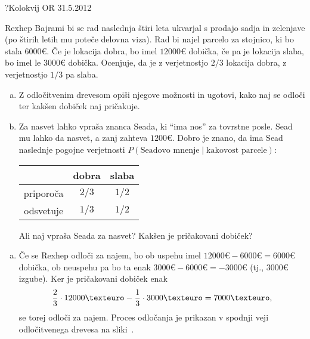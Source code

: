 \begin{naloga}{?}{Kolokvij OR 31.5.2012}
\begin{vprasanje}
Rexhep Bajrami bi se rad naslednja štiri leta
ukvarjal s prodajo sadja in zelenjave
(po štirih letih mu poteče delovna viza).
Rad bi najel parcelo za stojnico, ki bo stala $6000 €$.
Če je lokacija dobra, bo imel $12000 €$ dobička,
če pa je lokacija slaba, bo imel le $3000 €$ dobička.
Ocenjuje, da je z verjetnostjo $2/3$ lokacija dobra,
z verjetnostjo $1/3$ pa slaba.
\begin{enumerate}[(a)]
\item Z odločitvenim drevesom opiši njegove možnosti in ugotovi,
kako naj se odloči ter kakšen dobiček naj pričakuje.
\item Za nasvet lahko vpraša znanca Seada, ki ``ima nos'' za tovrstne posle.
Sead mu lahko da nasvet, a zanj zahteva $1200 €$.
Dobro je znano, da ima Sead naslednje pogojne verjetnosti
$P(\text{Seadovo mnenje} \; | \; \text{kakovost parcele})$:
\begin{center}
\begin{tabular}{c|cc}
& dobra & slaba \\
\hline
priporoča & $2/3$ & $1/2$ \\
odsvetuje & $1/3$ & $1/2$
\end{tabular}
\end{center}
Ali naj vpraša Seada za nasvet?
Kakšen je pričakovani dobiček?
\end{enumerate}
\end{vprasanje}

\begin{odgovor}
\begin{enumerate}[(a)]
\item Če se Rexhep odloči za najem,
bo ob uspehu imel $12000 € - 6000 € = 6000 €$ dobička,
ob neuspehu pa bo ta enak $3000 € - 6000 € = -3000 €$
(tj., $3000 €$ izgube).
Ker je pričakovani dobiček enak
$$
{2 \over 3} \cdot 12000 € - {1 \over 3} \cdot 3000 € = 7000 € ,
$$
se torej odloči za najem.
Proces odločanja je prikazan
v spodnji veji od\-lo\-čit\-ve\-ne\-ga drevesa na sliki~\fig{}.


\end{enumerate}
\end{odgovor}
\end{naloga}
